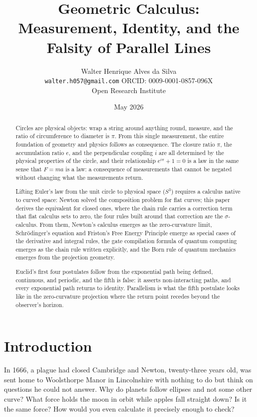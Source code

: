 \documentclass[12pt]{article}
\title{Geometric Calculus:\\Measurement, Identity, and the Falsity of Parallel Lines}
\author{Walter Henrique Alves da Silva\\
\texttt{walter.h057@gmail.com} \quad ORCID: 0009-0001-0857-096X\\
Open Research Institute}
\date{May 2026}
\begin{document}
\maketitle

\begin{abstract}
Circles are physical objects: wrap a string around anything round, measure, and the ratio of circumference to diameter is $\pi$. From this single measurement, the entire foundation of geometry and physics follows as consequence. The closure ratio $\pi$, the accumulation ratio $e$, and the perpendicular coupling $i$ are all determined by the physical properties of the circle, and their relationship $e^{i\pi} + 1 = 0$ is a law in the same sense that $F = ma$ is a law: a consequence of measurements that cannot be negated without changing what the measurements return.

Lifting Euler's law from the unit circle to physical space ($S^3$) requires a calculus native to curved space: Newton solved the composition problem for flat curves; this paper derives the equivalent for closed ones, where the chain rule carries a correction term that flat calculus sets to zero, the four rules built around that correction are the $\sigma$-calculus. From them, Newton's calculus emerges as the zero-curvature limit, Schr\"odinger's equation and Friston's Free Energy Principle emerge as special cases of the derivative and integral rules, the gate compilation formula of quantum computing emerges as the chain rule written explicitly, and the Born rule of quantum mechanics emerges from the projection geometry.

Euclid's first four postulates follow from the exponential path being defined, continuous, and periodic, and the fifth is false: it asserts non-interacting paths, and every exponential path returns to identity. Parallelism is what the fifth postulate looks like in the zero-curvature projection where the return point recedes beyond the observer's horizon.
\end{abstract}

\tableofcontents

\section{Introduction}

In 1666, a plague had closed Cambridge and Newton, twenty-three years old, was sent home to Woolsthorpe Manor in Lincolnshire with nothing to do but think on questions he could not answer. Why do planets follow ellipses and not some other curve? What force holds the moon in orbit while apples fall straight down? Is it the same force? How would you even calculate it precisely enough to check? 
\end{document}

